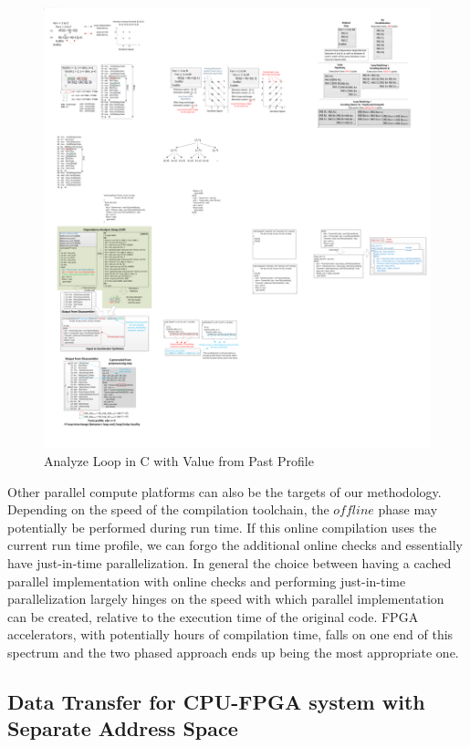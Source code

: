 \begin{figure}[htp]
\begin{center}
\includegraphics[width=0.85\linewidth]{chap6fig/sourceCodeAnalysis.pdf}
\caption{Analyze Loop in C with Value from Past Profile 
\label{fig:srcAna}}
\end{center}
\end{figure}

Other parallel compute platforms can also be the targets of our methodology. Depending on the speed of the compilation toolchain, the $offline$ phase may potentially be performed during run time. If this online compilation uses the current run time profile, we can forgo the additional online checks and essentially have just-in-time parallelization. In general the choice between having a cached parallel implementation with online checks and performing just-in-time parallelization largely hinges on the speed with which parallel implementation can be created, relative to the execution time of the original code. FPGA accelerators, with potentially hours of compilation time, falls on one end of this spectrum and the two phased approach ends up being the most appropriate one.



\subsection{Data Transfer for CPU-FPGA system with Separate Address Space}
\label{dtransfer}

